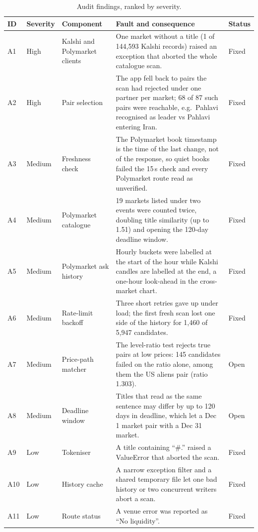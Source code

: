 \documentclass[5p,letterpaper]{elsarticle}
\begin{document}
\begin{table}[t]
\caption{Audit findings, ranked by severity.}\label{tab:audit}
\footnotesize
\begin{tabularx}{\textwidth}{@{}lllLl@{}}
\toprule
ID & Severity & Component & Fault and consequence & Status \\
\midrule
A1 & High & Kalshi and Polymarket clients & One market without a title (1 of 144,593 Kalshi records) raised an exception that aborted the whole catalogue scan. & Fixed \\
A2 & High & Pair selection & The app fell back to pairs the scan had rejected under one partner per market; 68 of 87 such pairs were reachable, e.g.\ Pahlavi recognised as leader vs Pahlavi entering Iran. & Fixed \\
A3 & Medium & Freshness check & The Polymarket book timestamp is the time of the last change, not of the response, so quiet books failed the 15\,s check and every Polymarket route read as unverified. & Fixed \\
A4 & Medium & Polymarket catalogue & 19 markets listed under two events were counted twice, doubling title similarity (up to 1.51) and opening the 120-day deadline window. & Fixed \\
A5 & Medium & Polymarket ask history & Hourly buckets were labelled at the start of the hour while Kalshi candles are labelled at the end, a one-hour look-ahead in the cross-market chart. & Fixed \\
A6 & Medium & Rate-limit backoff & Three short retries gave up under load; the first fresh scan lost one side of the history for 1,460 of 5,947 candidates. & Fixed \\
A7 & Medium & Price-path matcher & The level-ratio test rejects true pairs at low prices: 145 candidates failed on the ratio alone, among them the US aliens pair (ratio 1.303). & Open \\
A8 & Medium & Deadline window & Titles that read as the same sentence may differ by up to 120 days in deadline, which let a Dec 1 market pair with a Dec 31 market. & Open \\
A9 & Low & Tokeniser & A title containing ``\#.'' raised a ValueError that aborted the scan. & Fixed \\
A10 & Low & History cache & A narrow exception filter and a shared temporary file let one bad history or two concurrent writers abort a scan. & Fixed \\
A11 & Low & Route status & A venue error was reported as ``No liquidity''. & Fixed \\

\end{tabularx}
\end{table}
\end{document}

